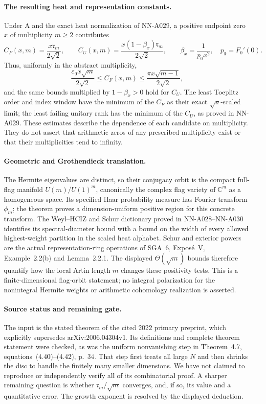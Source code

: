 \paragraph{The resulting heat and representation constants.}
Under A and the exact heat normalization of NN-A029, a positive
endpoint zero $x$ of multiplicity $m\ge2$ contributes
\[
 C_F(x,m)=\frac{x\mathfrak r_m}{2\sqrt2},\qquad
 C_U(x,m)=\frac{x(1-\beta_x)\mathfrak r_m}{2\sqrt2},
 \qquad\beta_x=\frac1{p_0x^2},\quad p_0=F_0'(0).
\]
Thus, uniformly in the abstract multiplicity,
\[
 \frac{\varepsilon_0x\sqrt m}{2\sqrt2}
       \le C_F(x,m)\le\frac{\pi x\sqrt{m-1}}{2\sqrt2},
\]
and the same bounds multiplied by $1-\beta_x>0$ hold for $C_U$.
The least Toeplitz order and index window have the minimum of
the $C_F$ as their exact $\sqrt a$-scaled limit; the least failing
unitary rank has the minimum of the $C_U$, as proved in NN-A029.
These estimates describe the dependence of each candidate on
multiplicity. They do not assert that arithmetic zeros of any
prescribed multiplicity exist or that their multiplicities tend
to infinity.

\paragraph{Geometric and Grothendieck translation.}
The Hermite eigenvalues are distinct, so their conjugacy orbit
is the compact full-flag manifold $U(m)/U(1)^m$, canonically the
complex flag variety of $\mathbb C^m$ as a homogeneous space.
Its specified Haar probability measure has Fourier transform
$\phi_m$; the theorem proves a dimension-uniform positive region
for this concrete transform. The Weyl--HCIZ and Schur dictionary
proved in NN-A028--NN-A030 identifies its spectral-diameter
bound with a bound on the width of every allowed highest-weight
partition in the scaled heat alphabet. Schur and exterior powers
are the actual representation-ring operations of SGA~6,
Expos\'e~V, Example~2.2(b) and Lemma~2.2.1. The displayed
$\Theta(\sqrt m)$ bounds therefore quantify how the local
Artin length $m$ changes these positivity tests. This is a
finite-dimensional flag-orbit statement; no integral polarization
for the nonintegral Hermite weights or arithmetic cohomology
realization is asserted.

\paragraph{Source status and remaining gate.}
The input is the stated theorem of the cited 2022 primary
preprint, which explicitly supersedes arXiv:2006.04304v1.
Its definitions and complete theorem statement were checked,
as was the uniform nonvanishing step in Theorem~4.7,
equations~(4.40)--(4.42), p.~34. That step first treats all large
$N$ and then shrinks the disc to handle the finitely many smaller
dimensions. We have not claimed to reproduce or independently
verify all of its combinatorial proof. A sharper remaining
question is whether $\mathfrak r_m/\sqrt m$ converges, and, if
so, its value and a quantitative error. The growth exponent is
resolved by the displayed deduction.
